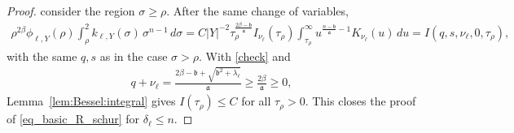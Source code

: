 \documentclass[12pt]{amsart}
\begin{document}
\begin{proof}
consider the region $\sigma \ge \rho$. After the same change of variables,
\begin{align*}
\rho^{2\beta}
    \phi_{\ell,Y}(\rho)
    \int_\rho^2
        k_{\ell,Y}(\sigma)\,\sigma^{n-1}\,d\sigma
    =
    C |Y|^{-2}
    \tau_\rho^{\frac{2\beta-\mathfrak b}{\mathfrak a}}
    I_{\nu_\ell}(\tau_\rho)
    \int_{\tau_\rho}^\infty
        u^{\frac{n-\mathfrak b}{\mathfrak a}-1}
        K_{\nu_\ell}(u) \, du = I(q,s,\nu_\ell
        ,0,\tau_\rho),
\end{align*}
with the same $q,s$ as in the case $\sigma>\rho$. With \eqref{check} and 
\begin{align*}
q+\nu_\ell = \frac{2\beta-\mathfrak b + \sqrt{\mathfrak b^2 + \lambda_\ell}}{\mathfrak a} \ge \frac{2\beta}{\mathfrak a}\ge 0,
\end{align*}
Lemma~\ref{lem:Bessel:integral} gives $I(\tau_\rho) \le C$ for all $\tau_\rho >0$. This closes the proof of \eqref{eq_basic_R_schur} for $\delta_\ell\le n$.


\end{proof}
\end{document}
